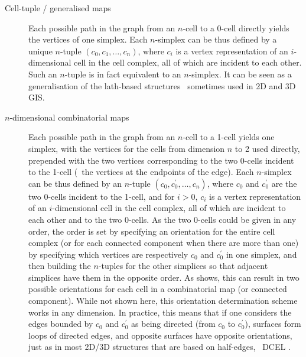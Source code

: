 \begin{description}
\item[Cell-tuple / generalised maps]
Each possible path in the graph from an $n$-cell to a 0-cell directly yields the vertices of one simplex.
Each $n$-simplex can be thus defined by a unique $n$-tuple $(c_{0}, c_{1}, \ldots, c_{n})$, where $c_{i}$ is a vertex representation of an $i$-dimensional cell in the cell complex, all of which are incident to each other.
Such an $n$-tuple is in fact equivalent to an $n$-simplex.
It can be seen as a generalisation of the lath-based structures~\citep{Joy03} sometimes used in 2D and 3D GIS.\@

\item[$n$-dimensional combinatorial maps]
Each possible path in the graph from an $n$-cell to a 1-cell yields one simplex, with the vertices for the cells from dimension $n$ to 2 used directly, prepended with the two vertices corresponding to the two 0-cells incident to the 1-cell (\ie\ the vertices at the endpoints of the edge).
Each $n$-simplex can be thus defined by an $n$-tuple $(c_{0}, c_{0}^\prime, \ldots, c_{n})$, where $c_{0}$ and $c_{0}^\prime$ are the two 0-cells incident to the 1-cell, and for $i > 0$, $c_{i}$ is a vertex representation of an $i$-dimensional cell in the cell complex, all of which are incident to each other and to the two 0-cells.
As the two 0-cells could be given in any order, the order is set by specifying an orientation for the entire cell complex (or for each connected component when there are more than one) by specifying which vertices are respectively $c_{0}$ and $c_{0}^\prime$ in one simplex, and then building the $n$-tuples for the other simplices so that adjacent simplices have them in the opposite order.
As  shows, this can result in two possible orientations for each cell in a combinatorial map (or connected component).
While not shown here, this orientation determination scheme works in any dimension.
In practice, this means that if one considers the edges bounded by $c_{0}$ and $c_{0}^\prime$ as being directed (from $c_{0}$ to $c_{0}^\prime$), surfaces form loops of directed edges, and opposite surfaces have opposite orientations, just as in most 2D/3D structures that are based on half-edges, \eg\ DCEL \citep{Muller78}.
\end{description}
